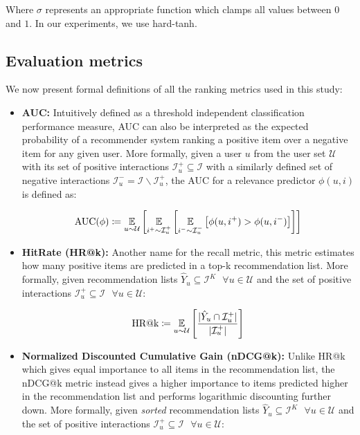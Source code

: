\documentclass{article}
\begin{document}
Where $\sigma$ represents an appropriate function which clamps all values between $0$ and $1$. In our experiments, we use hard-tanh.

\subsection{Evaluation metrics} \label{appendix:metrics}

We now present formal definitions of all the ranking metrics used in this study:

\begin{itemize}[leftmargin=.3in]
    \item \textbf{AUC:} Intuitively defined as a threshold independent classification performance measure, AUC can also be interpreted as the expected probability of a recommender system ranking a positive item over a negative item for any given user. More formally, given a user $u$ from the user set $\mathcal{U}$ with its set of positive interactions $\mathcal{I}_u^+ \subseteq \mathcal{I}$ with a similarly defined set of negative interactions $\mathcal{I}_u^- = \mathcal{I} \backslash \mathcal{I}_u^+$, the AUC for a relevance predictor $\phi(u, i)$ is defined as:
    
    \begin{equation*}
        \text{AUC}(\phi) \coloneqq \underset{u \sim \mathcal{U}}{\mathbb{E}} \left[\underset{i^+ \sim \mathcal{I}_u^+}{\mathbb{E}} \left[\underset{i^- \sim \mathcal{I}_u^-}{\mathbb{E}} \left[\phi(u, i^+) > \phi(u, i^-)\right]\right]\right]
    \end{equation*}
    
    \item \textbf{HitRate (HR@k):} Another name for the recall metric, this metric estimates how many positive items are predicted in a top-k recommendation list. More formally, given recommendation lists $\hat{Y}_u \subseteq \mathcal{I}^K ~~~ \forall u \in \mathcal{U}$ and the set of positive interactions $\mathcal{I}_u^+ \subseteq \mathcal{I} ~~~ \forall u \in \mathcal{U}$:
    
    \begin{equation*}
        \text{HR@k} \coloneqq \underset{u \sim \mathcal{U}}{\mathbb{E}} \left[\frac{|\hat{Y}_u \cap \mathcal{I}_u^+|}{|\mathcal{I}_u^+|}\right]
    \end{equation*}
    
    \item \textbf{Normalized Discounted Cumulative Gain (nDCG@k):} Unlike HR@k which gives equal importance to all items in the recommendation list, the nDCG@k metric instead gives a higher importance to items predicted higher in the recommendation list and performs logarithmic discounting further down. More formally, given \emph{sorted} recommendation lists $\hat{Y}_u \subseteq \mathcal{I}^K ~~~ \forall u \in \mathcal{U}$ and the set of positive interactions $\mathcal{I}_u^+ \subseteq \mathcal{I} ~~~ \forall u \in \mathcal{U}$:
    

\end{itemize}
\end{document}
